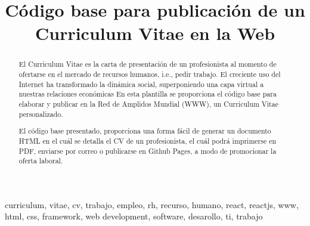 \title{Código base para publicación de un Curriculum Vitae en la Web}

\author{
}

\maketitle

\begin{abstract}
  El Curriculum Vitae es la carta de presentación de un profesionista al momento de ofertarse en el mercado de recursos humanos, i.e., pedir trabajo. El creciente uso del Internet ha transformado la dinámica social, superponiendo una capa virtual a nuestras relaciones económicas
  En esta plantilla se proporciona el código base para elaborar y publicar en la Red de Amplidos Mundial (WWW), un Curriculum Vitae personalizado.

  El código base presentado, proporciona una forma fácil de generar un documento HTML en el cuál se detalla el CV de un profesionista, el cuál podrá imprimerse en PDF, enviarse por correo o publicarse en Github Pages, a modo de promocionar la oferta laboral.
\end{abstract}

\begin{IEEEkeywords}
  curriculum, vitae, cv, trabajo, empleo, rh, recurso, humano, react, reactjs, www, html, css, framework, web development, software, desarollo, ti, trabajo
\end{IEEEkeywords}
